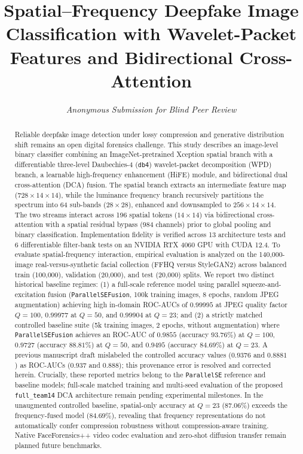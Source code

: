 \documentclass[11pt,a4paper]{article}
\title{\textbf{\Large Spatial--Frequency Deepfake Image Classification with Wavelet-Packet Features and Bidirectional Cross-Attention}}
\author{\textit{Anonymous Submission for Blind Peer Review}}
\date{\vspace{-1.5em}}
\begin{document}
\maketitle

\begin{abstract}
Reliable deepfake image detection under lossy compression and generative distribution shift remains an open digital forensics challenge. This study describes an image-level binary classifier combining an ImageNet-pretrained Xception spatial branch with a differentiable three-level Daubechies-4 (\texttt{db4}) wavelet-packet decomposition (WPD) branch, a learnable high-frequency enhancement (HiFE) module, and bidirectional dual cross-attention (DCA) fusion. The spatial branch extracts an intermediate feature map ($728 \times 14 \times 14$), while the luminance frequency branch recursively partitions the spectrum into 64 sub-bands ($28 \times 28$), enhanced and downsampled to $256 \times 14 \times 14$. The two streams interact across 196 spatial tokens ($14 \times 14$) via bidirectional cross-attention with a spatial residual bypass ($984$ channels) prior to global pooling and binary classification. 
Implementation fidelity is verified across 13 architecture tests and 6 differentiable filter-bank tests on an NVIDIA RTX 4060 GPU with CUDA 12.4. 
To evaluate spatial-frequency interaction, empirical evaluation is analyzed on the 140,000-image real-versus-synthetic facial collection (FFHQ versus StyleGAN2) across balanced train (100,000), validation (20,000), and test (20,000) splits. 
We report two distinct historical baseline regimes: (1) a full-scale reference model using parallel squeeze-and-excitation fusion (\texttt{ParallelSEFusion}, 100k training images, 8 epochs, random JPEG augmentation) achieving high in-domain ROC-AUCs of $0.99995$ at JPEG quality factor $Q=100$, $0.99977$ at $Q=50$, and $0.99904$ at $Q=23$; and (2) a strictly matched controlled baseline suite (5k training images, 2 epochs, without augmentation) where \texttt{ParallelSEFusion} achieves an ROC-AUC of $0.9855$ (accuracy $93.76\%$) at $Q=100$, $0.9727$ (accuracy $88.81\%$) at $Q=50$, and $0.9495$ (accuracy $84.69\%$) at $Q=23$. A previous manuscript draft mislabeled the controlled accuracy values ($0.9376$ and $0.8881$) as ROC-AUCs ($0.937$ and $0.888$); this provenance error is resolved and corrected herein. 
Crucially, these reported metrics belong to the \texttt{ParallelSE} reference and baseline models; full-scale matched training and multi-seed evaluation of the proposed \texttt{full\_team14} DCA architecture remain pending experimental milestones. In the unaugmented controlled baseline, spatial-only accuracy at $Q=23$ ($87.06\%$) exceeds the frequency-fused model ($84.69\%$), revealing that frequency representations do not automatically confer compression robustness without compression-aware training. 
Native FaceForensics++ video codec evaluation and zero-shot diffusion transfer remain planned future benchmarks.
\end{abstract}
\end{document}
